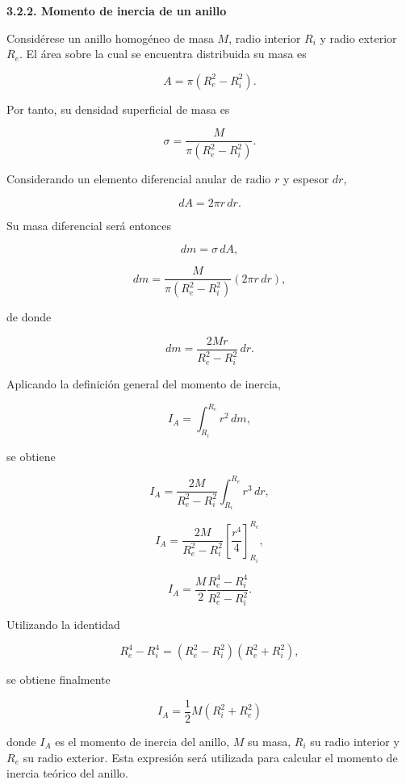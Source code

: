 \documentclass[11pt,a4paper]{article}
\begin{document}
\begin{list}{}{\leftmargin=1.2cm\rightmargin=0cm}
\textbf{3.2.2. Momento de inercia de un anillo}

\vspace{0.3em}

Considérese un anillo homogéneo de masa \(M\), radio interior \(R_i\) y
radio exterior \(R_e\). El área sobre la cual se encuentra distribuida su
masa es

\[
A=\pi(R_e^2-R_i^2).
\]

Por tanto, su densidad superficial de masa es

\[
\sigma=
\frac{M}
{\pi(R_e^2-R_i^2)}.
\]

Considerando un elemento diferencial anular de radio \(r\) y espesor \(dr\),

\[
dA=2\pi r\,dr.
\]

Su masa diferencial será entonces

\[
dm=\sigma\,dA,
\]

\[
dm=
\frac{M}
{\pi(R_e^2-R_i^2)}
(2\pi r\,dr),
\]

de donde

\[
dm=
\frac{2Mr}
{R_e^2-R_i^2}\,dr.
\]

Aplicando la definición general del momento de inercia,

\[
I_A=\int_{R_i}^{R_e}r^2\,dm,
\]

se obtiene

\[
I_A=
\frac{2M}{R_e^2-R_i^2}
\int_{R_i}^{R_e}r^3\,dr,
\]

\[
I_A=
\frac{2M}{R_e^2-R_i^2}
\left[
\frac{r^4}{4}
\right]_{R_i}^{R_e},
\]

\[
I_A=
\frac{M}{2}
\frac{R_e^4-R_i^4}
{R_e^2-R_i^2}.
\]

Utilizando la identidad

\[
R_e^4-R_i^4
=
(R_e^2-R_i^2)(R_e^2+R_i^2),
\]

se obtiene finalmente

\begin{equation}
I_A=
\frac{1}{2}M(R_i^2+R_e^2)
\label{eq:inercia_anillo}
\end{equation}

donde \(I_A\) es el momento de inercia del anillo, \(M\) su masa,
\(R_i\) su radio interior y \(R_e\) su radio exterior. Esta expresión será
utilizada para calcular el momento de inercia teórico del anillo.

\end{list}


\end{document}
